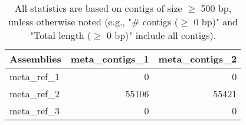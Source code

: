 \documentclass[12pt,a4paper]{article}
\begin{document}
\begin{table}[ht]
\begin{center}
\caption{All statistics are based on contigs of size $\geq$ 500 bp, unless otherwise noted (e.g., "\# contigs ($\geq$ 0 bp)" and "Total length ($\geq$ 0 bp)" include all contigs).}
\begin{tabular}{|l*{2}{|r}|}
\hline
Assemblies & meta\_contigs\_1 & meta\_contigs\_2 \\ \hline
meta\_ref\_1 & 0 & 0 \\ \hline
meta\_ref\_2 & 55106 & 55421 \\ \hline
meta\_ref\_3 & 0 & 0 \\ \hline
\end{tabular}
\end{center}
\end{table}
\end{document}
